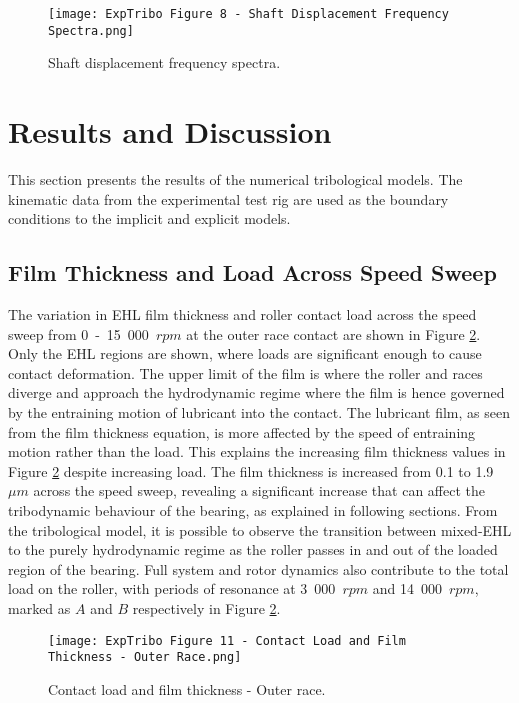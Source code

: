 \begin{figure}
	\centering
	\texttt{[image: ExpTribo Figure 8 - Shaft Displacement Frequency Spectra.png]}
	\caption{Shaft displacement frequency spectra.}
	\label{Shaft displacement frequency spectra}
\end{figure}

\section{Results and Discussion}
This section presents the results of the numerical tribological models. The kinematic data from the experimental test rig are used as the boundary conditions to the implicit and explicit models.

\subsection{Film Thickness and Load Across Speed Sweep} 
The variation in EHL film thickness and roller contact load across the speed sweep from 0~-~15~000~$rpm$ at the outer race contact are shown in Figure \ref{Contact load and film thickness - Outer race}. Only the EHL regions are shown, where loads are significant enough to cause contact deformation. The upper limit of the film is where the roller and races diverge and approach the hydrodynamic regime where the film is hence governed by the entraining motion of lubricant into the contact. The lubricant film, as seen from the film thickness equation, is more affected by the speed of entraining motion rather than the load. This explains the increasing film thickness values in Figure \ref{Contact load and film thickness - Outer race} despite increasing load. The film thickness is increased from 0.1 to 1.9~$\mu m$ across the speed sweep, revealing a significant increase that can affect the tribodynamic behaviour of the bearing, as explained in following sections. From the tribological model, it is possible to observe the transition between mixed-EHL to the purely hydrodynamic regime as the roller passes in and out of the loaded region of the bearing. Full system and rotor dynamics also contribute to the total load on the roller, with periods of resonance at 3~000~$rpm$ and 14~000~$rpm$, marked as $A$ and $B$ respectively in Figure \ref{Contact load and film thickness - Outer race}.

\begin{figure}
	\centering
	\texttt{[image: ExpTribo Figure 11 - Contact Load and Film Thickness - Outer Race.png]}
	\caption{Contact load and film thickness - Outer race.}
	\label{Contact load and film thickness - Outer race}
\end{figure}

